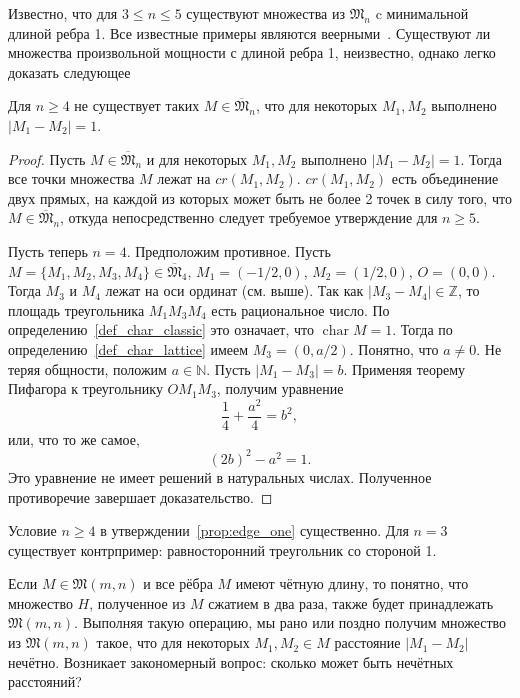 Известно, что для $3\leq n \leq 5$ существуют множества из $\mathfrak{M}_n$
c минимальной длиной ребра 1.
Все известные примеры являются веерными~\cite{harborth1993upper}.
Существуют ли множества произвольной мощности с длиной ребра 1,
неизвестно, однако легко доказать следующее
\begin{proposition}
	\label{prop:edge_one}
	Для $n \geq 4$ не существует таких $M\in\overline{\mathfrak{M}}_n$,
	что для некоторых $M_1, M_2$ выполнено $|M_1 - M_2| = 1$.
\end{proposition}
\begin{proof}
	Пусть $M\in\overline{\mathfrak{M}}_n$ и для некоторых $M_1, M_2$ выполнено $|M_1 - M_2| = 1$.
	Тогда все точки множества $M$ лежат на $cr(M_1,M_2)$.
	$cr(M_1,M_2)$ есть объединение двух прямых, на каждой из которых может быть не более 2 точек в силу того, что
	$M\in\overline{\mathfrak{M}}_n$,
	откуда непосредственно следует требуемое утверждение для $n\geq 5$.

	Пусть теперь $n=4$.
	Предположим противное.
	Пусть $M=\{M_1, M_2, M_3, M_4\} \in \overline{\mathfrak{M}}_4$,
	$M_1 = (-1/2, 0)$, $M_2 = (1/2, 0)$, $O=(0,0)$.
	Тогда $M_3$ и $M_4$ лежат на оси ординат (см. выше).
	Так как $|M_3 - M_4| \in \mathbb{Z}$,
	то площадь треугольника $M_1 M_3 M_4$ есть рациональное число.
	По определению~\ref{def_char_classic} это означает, что $\operatorname{char} M = 1$.
	Тогда по определению~\ref{def_char_lattice} имеем $M_3 = (0, a/2)$.
	Понятно, что $a \neq 0$.
	Не теряя общности, положим $a\in\mathbb{N}$.
	Пусть $|M_1 - M_3| = b$.
	Применяя теорему Пифагора к треугольнику $O M_1 M_3$, получим уравнение
	\begin{equation*}
		\frac{1}{4} + \frac{a^2}{4} = b^2
		,
	\end{equation*}
	или, что то же самое,
	\begin{equation*}
		(2b)^2 - a^2 = 1
		.
	\end{equation*}
	Это уравнение не имеет решений в натуральных числах.
	Полученное противоречие завершает доказательство.
\end{proof}
Условие $n \geq 4$ в утверждении~\ref{prop:edge_one} существенно.
Для $n=3$ существует контрпример: равносторонний треугольник со стороной 1.



Если $M\in\mathfrak{M}(m,n)$ и все рёбра $M$ имеют чётную длину,
то понятно, что множество $H$, полученное из $M$ сжатием в два раза,
также будет принадлежать $\mathfrak{M}(m,n)$.
Выполняя такую операцию, мы рано или поздно получим множество из $\mathfrak{M}(m,n)$ такое,
что для некоторых $M_1,M_2\in M$ расстояние $|M_1 - M_2|$ нечётно.
Возникает закономерный вопрос: сколько может быть нечётных расстояний?

